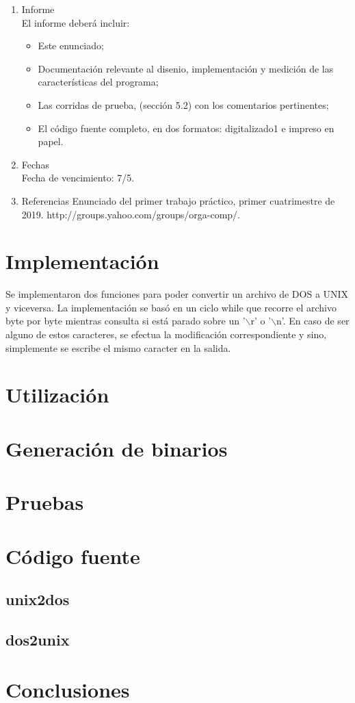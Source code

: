 \documentclass[a4paper,11pt]{article}
\begin{document}
\begin{enumerate}
\item Informe\\
El informe deber\'a incluir:
\begin{itemize}
\item Este enunciado;

\item Documentaci\'on relevante al disenio, implementaci\'on y medici\'on de las
caracter\'isticas del programa;

\item Las corridas de prueba, (secci\'on 5.2) con los comentarios pertinentes;

\item El c\'odigo fuente completo, en dos formatos: digitalizado1 e impreso en
papel. 
\end{itemize}

\item Fechas \\
Fecha de vencimiento: 7/5.

\item Referencias
Enunciado del primer trabajo pr\'actico, primer cuatrimestre de 2019.
http://groups.yahoo.com/groups/orga-comp/.

\end{enumerate}
\newpage

\section{Implementaci\'on}
Se implementaron dos funciones para poder convertir un archivo de DOS a UNIX y viceversa. La implementaci\'on se basó en un ciclo while que recorre el archivo byte por byte mientras consulta si está parado sobre un '$\backslash$r' o '$\backslash$n'. En caso de ser alguno de estos caracteres, se efectua la modificación correspondiente y sino, simplemente se escribe el mismo caracter en la salida.

\section{Utilización}

\section{Generaci\'on de binarios}

\section{Pruebas}

\section{C\'odigo fuente}
\subsection{unix2dos}

\subsection{dos2unix}

\section{Conclusiones}
\end{document}
